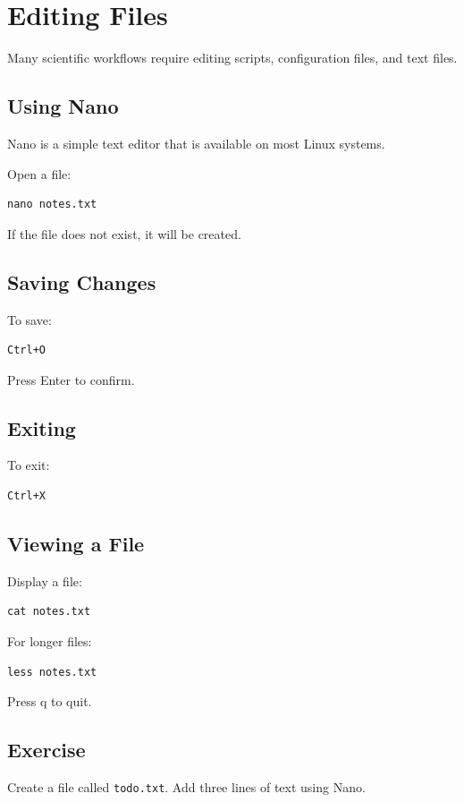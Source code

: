 \section{Editing Files}

Many scientific workflows require editing scripts, configuration files, and text files.

\subsection{Using Nano}

Nano is a simple text editor that is available on most Linux systems.

Open a file:

\begin{lstlisting}
nano notes.txt
\end{lstlisting}

If the file does not exist, it will be created.

\subsection{Saving Changes}

To save:

\begin{lstlisting}
Ctrl+O
\end{lstlisting}

Press Enter to confirm.

\subsection{Exiting}

To exit:

\begin{lstlisting}
Ctrl+X
\end{lstlisting}

\subsection{Viewing a File}

Display a file:

\begin{lstlisting}
cat notes.txt
\end{lstlisting}

For longer files:

\begin{lstlisting}
less notes.txt
\end{lstlisting}

Press q to quit.

\subsection{Exercise}

Create a file called \texttt{todo.txt}. Add three lines of text using Nano.
